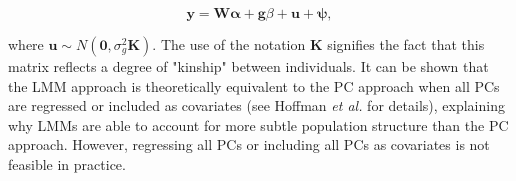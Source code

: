 \begin{equation}\label{eq:Linear_mixed_model}
 \mathbf{y} =  \mathbf{W}\boldsymbol{\alpha} + \mathbf{g}\beta + \mathbf{u} + \boldsymbol{\psi}, 
\end{equation}

where $\mathbf{u} \sim N(\mathbf{0}, \sigma_g^2\mathbf{K})$.
The use of the notation $\mathbf{K}$ signifies the fact that this matrix reflects a degree of "kinship" between individuals. 
It can be shown that the LMM approach is theoretically equivalent to the PC
approach when all PCs are regressed or included as covariates (see Hoffman \textit{et al.} \cite{hoffman2013correcting} for details), explaining why LMMs are able to account for more subtle population structure than the PC approach. 
However, regressing all PCs or including all PCs as covariates is not feasible in practice.












